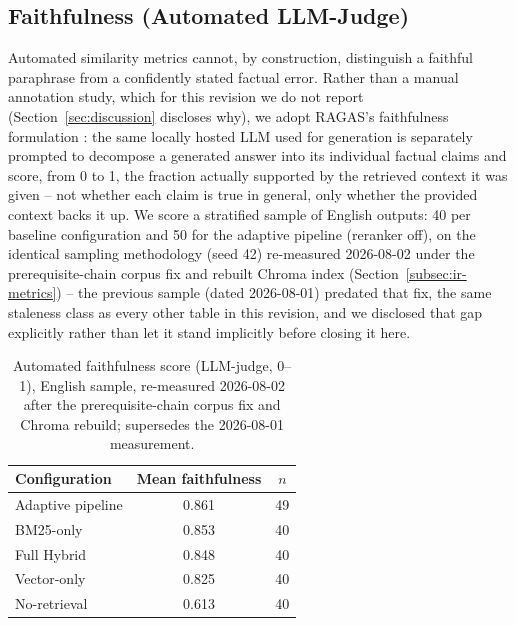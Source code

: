 \documentclass[a4paper,twoside]{article}
\begin{document}
\subsection{Faithfulness (Automated LLM-Judge)}
\label{subsec:faithfulness}

Automated similarity metrics cannot, by construction, distinguish a faithful paraphrase from a confidently stated factual error. Rather than a manual annotation study, which for this revision we do not report (Section~\ref{sec:discussion} discloses why), we adopt RAGAS's faithfulness formulation \citep{es2023ragas}: the same locally hosted LLM used for generation is separately prompted to decompose a generated answer into its individual factual claims and score, from 0 to 1, the fraction actually supported by the retrieved context it was given -- not whether each claim is true in general, only whether the provided context backs it up. We score a stratified sample of English outputs: 40 per baseline configuration and 50 for the adaptive pipeline (reranker off), on the identical sampling methodology (seed 42) re-measured 2026-08-02 under the prerequisite-chain corpus fix and rebuilt Chroma index (Section~\ref{subsec:ir-metrics}) -- the previous sample (dated 2026-08-01) predated that fix, the same staleness class as every other table in this revision, and we disclosed that gap explicitly rather than let it stand implicitly before closing it here.

\begin{table}[t]
\caption{Automated faithfulness score (LLM-judge, 0--1), English sample, re-measured 2026-08-02 after the prerequisite-chain corpus fix and Chroma rebuild; supersedes the 2026-08-01 measurement.}\label{tab:faithfulness} \centering
\begin{tabular}{|l|c|c|}
\hline
Configuration & Mean faithfulness & $n$ \\
\hline
Adaptive pipeline & 0.861 & 49 \\
BM25-only & 0.853 & 40 \\
Full Hybrid & 0.848 & 40 \\
Vector-only & 0.825 & 40 \\
No-retrieval & 0.613 & 40 \\
\hline
\end{tabular}
\end{table}
\end{document}
